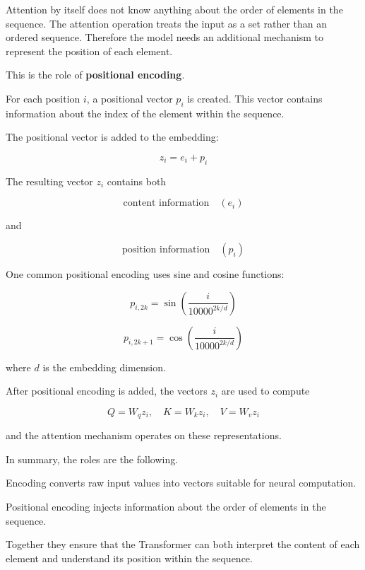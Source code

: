 \documentclass[a4paper]{article}
\title{}
\date{}
\begin{document}
    \maketitle
    
    Attention by itself does not know anything about the order of elements in the sequence. The attention operation treats the input as a set rather than an ordered sequence. Therefore the model needs an additional mechanism to represent the position of each element.
    
    This is the role of \textbf{positional encoding}.
    
    For each position \(i\), a positional vector \(p_i\) is created. This vector contains information about the index of the element within the sequence.
    
    The positional vector is added to the embedding:
    
    \[
    z_i = e_i + p_i
    \]
    
    The resulting vector \(z_i\) contains both
    
    \[
    \text{content information} \quad (e_i)
    \]
    
    and
    
    \[
    \text{position information} \quad (p_i)
    \]
    
    One common positional encoding uses sine and cosine functions:
    
    \[
    p_{i,2k} = \sin\!\left(\frac{i}{10000^{2k/d}}\right)
    \]
    
    \[
    p_{i,2k+1} = \cos\!\left(\frac{i}{10000^{2k/d}}\right)
    \]
    
    where \(d\) is the embedding dimension.
    
    After positional encoding is added, the vectors \(z_i\) are used to compute
    
    \[
    Q = W_q z_i, \quad K = W_k z_i, \quad V = W_v z_i
    \]
    
    and the attention mechanism operates on these representations.
    
    In summary, the roles are the following.
    
    Encoding converts raw input values into vectors suitable for neural computation.
    
    Positional encoding injects information about the order of elements in the sequence.
    
    Together they ensure that the Transformer can both interpret the content of each element and understand its position within the sequence.
    
\end{document}
